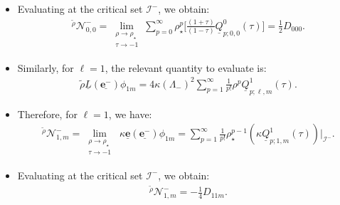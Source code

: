 \documentclass{beamer}
\theoremstyle{remark}
\theoremstyle{plain}
\theoremstyle{plain}
\begin{document}
\begin{frame}
  \begin{itemize}
    \item Evaluating at the critical set $\mathcal{I}^{-}$, we obtain:
    \begin{align}
      \mathcal{}^{\tilde{\rho}}\mathcal{N}^{-}_{0,0} = \lim_{\substack{\rho \to \rho_{\star} \\ \tau \to -1}}\sum_{p=0}^{\infty}\rho_{\star}^p\biggl[\frac{(1+\tau)}{(1-\tau)}\underline{Q}^{0}_{p;0,0}(\tau)\biggr] = \frac{1}{2}D_{000}. \nonumber
    \end{align}
    \item Similarly, for $\ell=1$, the relevant quantity to evaluate is:
    \begin{align}
      \tilde{\rho} \underline{L} (\underline{\boldsymbol{e}^{-}}) \phi_{1m}= 4\kappa(\Lambda_{-})^{2}\sum_{p=1}^{\infty}\frac{1}{p!}\rho^p\underline{Q}^{1}_{p;\ell,m}(\tau). \nonumber
    \end{align}
    \item Therefore, for $\ell=1$, we have:
    \begin{align}
      \mathcal{}^{\tilde{\rho}}\mathcal{N}^{-}_{1,m} = \lim_{\substack{\rho \to \rho_{\star} \\ \tau \to -1}} \; \kappa\underline{\boldsymbol{e}}(\underline{\boldsymbol{e}^{-}})\phi_{1m} = \sum_{p=1}^{\infty}\frac{1}{p!}\rho_{\star}^{p-1}(\kappa \underline{Q}^{1}_{p;1,m}(\tau))|_{\mathscr{I}^{-}}. \nonumber
    \end{align}
    \item Evaluating at the critical set $\mathcal{I}^{-}$, we obtain:
    \begin{align}
      \mathcal{}^{\tilde{\rho}}\mathcal{N}^{-}_{1,m} = - \frac{1}{4}D_{11m}. \nonumber
    \end{align}
  \end{itemize}
\end{frame}
\end{document}
